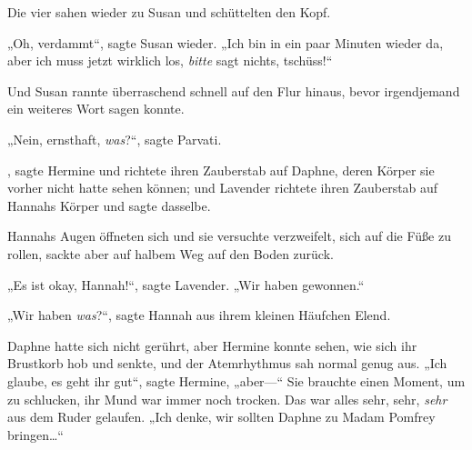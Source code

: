 Die vier sahen wieder zu Susan und schüttelten den Kopf.

„Oh, verdammt“, sagte Susan wieder. „Ich bin in ein paar Minuten wieder da, aber ich muss jetzt wirklich los, \emph{bitte} sagt nichts, tschüss!“

Und Susan rannte überraschend schnell auf den Flur hinaus, bevor irgendjemand ein weiteres Wort sagen konnte.

„Nein, ernsthaft, \emph{was}?“, sagte Parvati.

, sagte Hermine und richtete ihren Zauberstab auf Daphne, deren Körper sie vorher nicht hatte sehen können; und Lavender richtete ihren Zauberstab auf Hannahs Körper und sagte dasselbe.

Hannahs Augen öffneten sich und sie versuchte verzweifelt, sich auf die Füße zu rollen, sackte aber auf halbem Weg auf den Boden zurück.

„Es ist okay, Hannah!“, sagte Lavender. „Wir haben gewonnen.“

„Wir haben \emph{was}?“, sagte Hannah aus ihrem kleinen Häufchen Elend.

Daphne hatte sich nicht gerührt, aber Hermine konnte sehen, wie sich ihr Brustkorb hob und senkte, und der Atemrhythmus sah normal genug aus. „Ich glaube, es geht ihr gut“, sagte Hermine, „aber—“ Sie brauchte einen Moment, um zu schlucken, ihr Mund war immer noch trocken. Das war alles sehr, sehr, \emph{sehr} aus dem Ruder gelaufen. „Ich denke, wir sollten Daphne zu Madam Pomfrey bringen…“

